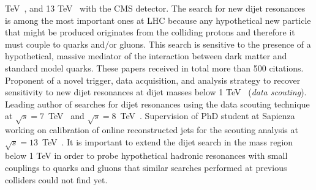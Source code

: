 \documentclass[10pt, a4paper]{article}
\newcommand{\years}[1]{\marginnote{\hskip-0.2in{\scriptsize #1}}}
\begin{document}
TeV~\cite{Chatrchyan:2013qha,AN-12-229,Khachatryan:2015sja,AN-12-455},
and 13 TeV~\cite{Sirunyan:2016iap,AN-16-202,Khachatryan:2015dcf,AN-15-063,AN-15-175} with the CMS
detector. The search for new dijet resonances is among the most important ones at LHC because any hypothetical new
particle that might be produced originates from the colliding protons
and therefore it must couple to quarks and/or gluons. This search is
sensitive to the presence of a hypothetical, massive  mediator of the interaction between dark matter and
standard model quarks. These papers received in total more than 500 citations.\\ [1em] 
\years{09/2011 - today}
Proponent of a novel trigger, data acquisition, and analysis
strategy to recover sensitivity to new dijet resonances at dijet
masses below 1 TeV~\cite{CMS-DP-2012-022} ({\it data scouting}).
Leading author of searches for dijet resonances using the data
scouting technique at $\sqrt{s}=7$~TeV~\cite{CMS-PAS-EXO-11-094} 
and $\sqrt{s}=8$~TeV~\cite{Khachatryan:2016ecr,AN-14-104}. Supervision
of PhD student at Sapienza working on calibration of online
reconstructed jets for the scouting analysis
at~$\sqrt{s}=13$~TeV~\cite{Sirunyan:2016iap,AN-16-202}. 
It is important to extend the dijet search in the mass region below 1 TeV 
in order to probe hypothetical hadronic resonances with small
couplings to quarks and gluons that similar searches performed at
previous colliders could not find yet. \\ [1em] 
\end{document}

